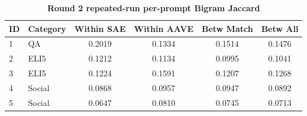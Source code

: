 \begin{table}[htbp]
\centering
\caption{\textbf{Round 2 repeated-run per-prompt Bigram Jaccard}}
\label{tab:round2-repeated-bigram-jaccard-per-prompt}
\renewcommand{\arraystretch}{1.4}
\begin{tabular}{|l|l|c|c|c|c|}
\hline
\textbf{ID} & \textbf{Category} & \textbf{Within SAE} & \textbf{Within AAVE} & \textbf{Betw Match} & \textbf{Betw All} \\
\hline
1 & QA & 0.2019 & 0.1334 & 0.1514 & 0.1476 \\
\hline
2 & ELI5 & 0.1212 & 0.1134 & 0.0995 & 0.1041 \\
\hline
3 & ELI5 & 0.1224 & 0.1591 & 0.1207 & 0.1268 \\
\hline
4 & Social & 0.0868 & 0.0957 & 0.0947 & 0.0892 \\
\hline
5 & Social & 0.0647 & 0.0810 & 0.0745 & 0.0713 \\
\hline
\end{tabular}
\end{table}
